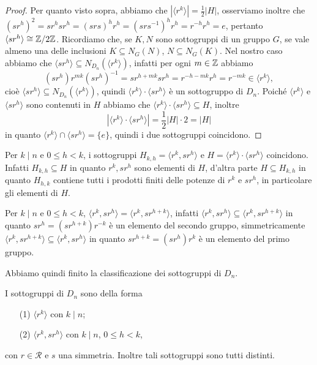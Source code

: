 \documentclass[11pt]{scrartcl}
\begin{document}
\begin{proof}
    Per quanto visto sopra, abbiamo che $|\langle r^k\rangle| = 
    \displaystyle\frac 1 2|H|$, osserviamo inoltre che $(sr^h)^2 = sr^hsr^h = 
    (srs)^hr^h = (srs^{-1})^hr^h = r^{-h}r^h = e$, pertanto 
    $\langle sr^h\rangle \cong \mathbb{Z}/{2}\mathbb{Z}$. Ricordiamo che, se $K, N$ sono sottogruppi
    di un gruppo $G$, se vale almeno una delle inclusioni $K \subseteq N_G(N)$,
    $N \subseteq N_G(K)$. Nel nostro caso abbiamo che $\langle sr^h\rangle
    \subseteq N_{D_n}(\langle r^k\rangle)$, infatti per ogni $m \in \mathbb Z$ abbiamo\[
        (sr^h)r^{mk}(sr^h)^{-1} = sr^{h + mk} sr^h = r^{-h-mk}r^h = r^{-mk}
        \in \langle r^k \rangle,
    \]cioè $\langle sr^h\rangle \subseteq N_{D_n}(\langle r^k\rangle)$, quindi
    $\langle r^k\rangle\cdot\langle sr^h\rangle$ è un sottogruppo di $D_n$.
    Poiché $\langle r^k\rangle$ e $\langle sr^h\rangle$ sono contenuti in $H$
    abbiamo che $\langle r^k\rangle\cdot\langle sr^h\rangle \subseteq H$, inoltre
    \[|\langle r^k\rangle\cdot\langle sr^h\rangle| = \displaystyle\frac 1 2 |H|\cdot 2 = |H|\]
    in quanto $\langle r^k\rangle\cap\langle sr^h\rangle = \{e\}$, quindi 
    i due sottogruppi coincidono.
\end{proof}

\begin{remark}
    Per $k \mid n$ e $0\leq h < k$, i sottogruppi $H_{k, h} = \langle r^k, sr^h\rangle$
    e $H = \langle r^k\rangle\cdot\langle sr^h\rangle$ coincidono. Infatti 
    $H_{k, h}\subseteq H$ in quanto $r^k, sr^h$ sono elementi di $H$, 
    d'altra parte $H \subseteq H_{k, h}$ in quanto $H_{h, k}$ contiene tutti i 
    prodotti finiti delle potenze di $r^k$ e $sr^h$, in particolare gli elementi di $H$.
\end{remark}

\begin{remark}
    Per $k \mid n$ e $0\leq h < k$, $\langle r^k, sr^h\rangle = 
    \langle r^k, sr^{h + k}\rangle$, infatti $\langle r^k, sr^h\rangle \subseteq
    \langle r^k, sr^{h + k}\rangle$ in quanto $sr^h = (sr^{h + k})r^{-k}$ è
    un elemento del secondo gruppo, simmetricamente $\langle r^k, sr^{h + k}\rangle
    \subseteq \langle r^k, sr^h\rangle$ in quanto $sr^{h + k} = (sr^h)r^k$ è un
    elemento del primo gruppo.
\end{remark}

Abbiamo quindi finito la classificazione dei sottogruppi di $D_n$.

\begin{theorem}
I sottogruppi di $D_n$ sono della forma \begin{itemize}
    \item[(1)] $\langle r^k\rangle$ con $k\mid n$;
    \item[(2)] $\langle r^k, sr^h\rangle$ con $k \mid n$, $0\leq h < k$, 
\end{itemize}
con $r \in \mathcal{R}$ e $s$ una simmetria. Inoltre tali sottogruppi sono
tutti distinti.
\end{theorem}
\end{document}
